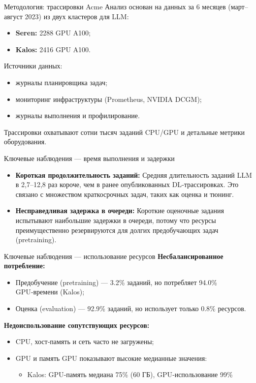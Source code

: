 \begin{frame}{Методология: трассировки Acme}
	Анализ основан на данных за 6 месяцев (март–август 2023) из двух кластеров для LLM:
	\begin{itemize}
		\item \textbf{Seren:} 2288 GPU A100;
		\item \textbf{Kalos:} 2416 GPU A100.
	\end{itemize}
	
	Источники данных:
	\begin{itemize}
		\item журналы планировщика задач;
		\item мониторинг инфраструктуры (Prometheus, NVIDIA DCGM);
		\item журналы выполнения и профилирование.
	\end{itemize}
	
	Трассировки охватывают сотни тысяч заданий CPU/GPU и детальные метрики оборудования.
\end{frame}

\begin{frame}{Ключевые наблюдения — время выполнения и задержки}
	\begin{itemize}
		\item \textbf{Короткая продолжительность заданий:} 
		Средняя длительность заданий LLM в 2,7–12,8 раз короче, чем в ранее опубликованных DL‑трассировках. 
		Это связано с множеством краткосрочных задач, таких как оценка и тюнинг.
		
		\item \textbf{Несправедливая задержка в очереди:} 
		Короткие оценочные задания испытывают наибольшие задержки в очереди, 
		потому что ресурсы преимущественно резервируются для долгих предобучающих задач (pretraining).
	\end{itemize}
\end{frame}

\begin{frame}{Ключевые наблюдения — использование ресурсов}
	\textbf{Несбалансированное потребление:}
	\begin{itemize}
		\item Предобучение (pretraining) — 3.2\% заданий, но потребляет 94.0\% GPU‑времени (Kalos);
		\item Оценка (evaluation) — 92.9\% заданий, но использует только 0.8\% ресурсов.
	\end{itemize}
	
	\textbf{Недоиспользование сопутствующих ресурсов:}
	\begin{itemize}
		\item CPU, хост‑память и сеть часто не загружены;
		\item GPU и память GPU показывают высокие медианные значения:
		\begin{itemize}
			\item Kalos: GPU‑память медиана 75\% (60 ГБ), GPU‑использование 99\%
		\end{itemize}
	\end{itemize}
\end{frame}


